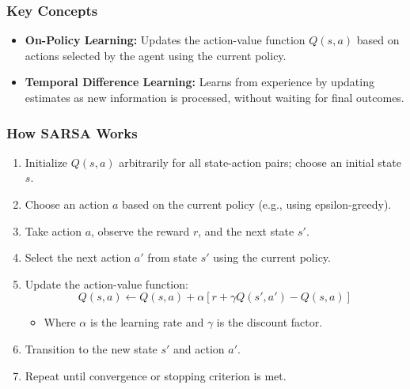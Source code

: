 \documentclass[aspectratio=169]{beamer}
\begin{document}
\begin{frame}[fragile]
    \frametitle{Key Concepts}
    \begin{itemize}
        \item \textbf{On-Policy Learning:} Updates the action-value function $Q(s, a)$ based on actions selected by the agent using the current policy.
        \item \textbf{Temporal Difference Learning:} Learns from experience by updating estimates as new information is processed, without waiting for final outcomes.
    \end{itemize}
\end{frame}

\begin{frame}[fragile]
    \frametitle{How SARSA Works}
    \begin{enumerate}
        \item Initialize $Q(s, a)$ arbitrarily for all state-action pairs; choose an initial state $s$.
        \item Choose an action $a$ based on the current policy (e.g., using epsilon-greedy).
        \item Take action $a$, observe the reward $r$, and the next state $s'$.
        \item Select the next action $a'$ from state $s'$ using the current policy.
        \item Update the action-value function:
        \begin{equation}
            Q(s, a) \leftarrow Q(s, a) + \alpha \left[ r + \gamma Q(s', a') - Q(s, a) \right]
        \end{equation}
        \begin{itemize}
            \item Where $\alpha$ is the learning rate and $\gamma$ is the discount factor.
        \end{itemize}
        \item Transition to the new state $s'$ and action $a'$.
        \item Repeat until convergence or stopping criterion is met.
    \end{enumerate}
\end{frame}
\end{document}
